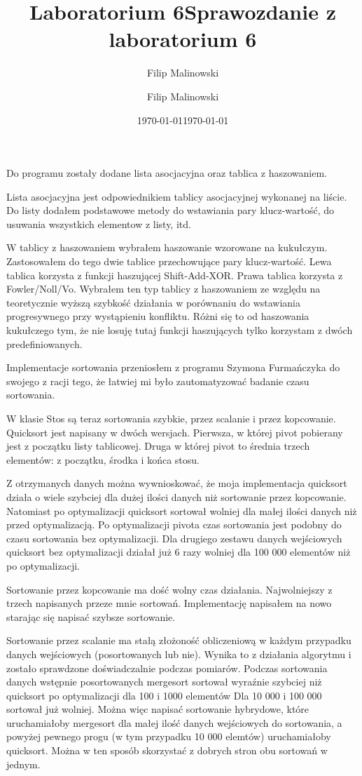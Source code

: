 \documentclass[a4paper,10pt]{scrartcl}
\title{Laboratorium 6}
\author{Filip Malinowski}
\date{\today}
\begin{document}
\title{Sprawozdanie z laboratorium 6}
\author{Filip Malinowski}
\date{\today}

\maketitle

Do programu zostały dodane lista asocjacyjna
oraz tablica z haszowaniem.

Lista asocjacyjna jest odpowiednikiem tablicy
asocjacyjnej wykonanej na liście. Do listy
dodałem podstawowe metody do wstawiania pary
klucz-wartość, do usuwania wszystkich elementow
z listy, itd.

W tablicy z haszowaniem wybrałem haszowanie
wzorowane na kukułczym. Zastosowałem do tego
dwie tablice przechowujące pary klucz-wartość.
Lewa tablica korzysta z funkcji haszującej
Shift-Add-XOR. Prawa tablica korzysta z
Fowler/Noll/Vo.
Wybrałem ten typ tablicy z haszowaniem
ze względu na teoretycznie wyższą szybkość
działania w porównaniu do wstawiania
progresywnego przy wystąpieniu konfliktu.
Różni się to od haszowania kukułczego tym,
że nie losuję tutaj funkcji haszujących
tylko korzystam z dwóch predefiniowanych.

\pagebreak

Implementacje sortowania przeniosłem z programu
Szymona Furmańczyka do swojego z racji tego, że
łatwiej mi było zautomatyzować badanie czasu
sortowania.

W klasie Stos są teraz sortowania szybkie, przez
scalanie i przez kopcowanie. Quicksort jest napisany
w dwóch wersjach. Pierwsza, w której pivot pobierany
jest z początku listy tablicowej. Druga w której 
pivot to średnia trzech elementów: z początku,
środka i końca stosu.

Z otrzymanych danych można wywnioskować, że moja implementacja
quicksort działa o wiele szybciej dla dużej ilości danych 
niż sortowanie przez kopcowanie. Natomiast po optymalizacji
quicksort sortował wolniej dla małej ilości danych niż przed
optymalizacją. Po optymalizacji pivota czas sortowania jest
podobny do czasu sortowania bez optymalizacji.
Dla drugiego zestawu danych wejściowych quicksort bez optymalizacji
działał już 6 razy wolniej dla 100 000 elementów niż po optymalizacji.

Sortowanie przez kopcowanie ma dość wolny czas działania.
Najwolniejszy z trzech napisanych przeze mnie sortowań.
Implementację napisałem na nowo starając się napisać szybsze
sortowanie.

Sortowanie przez scalanie ma stałą złożoność obliczeniową
w każdym przypadku danych wejściowych (posortowanych
lub nie). Wynika to z działania algorytmu i zostało
sprawdzone doświadczalnie podczas pomiarów.
Podczas sortowania danych wstępnie posortowanych
mergesort sortował wyraźnie szybciej niż
quicksort po optymalizacji dla 100 i 1000 elementów
Dla 10 000 i 100 000 sortował już wolniej.
Można więc napisać sortowanie hybrydowe, które
uruchamiałoby mergesort dla małej ilość danych
wejściowych do sortowania, a powyżej pewnego
progu (w tym przypadku 10 000 elemtów) uruchamiałoby
quicksort. Można w ten sposób skorzystać z
dobrych stron obu sortowań w jednym.
\end{document}
